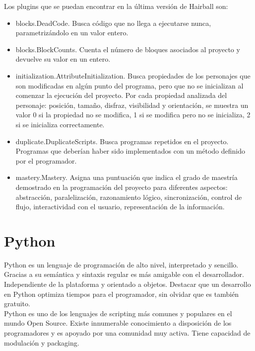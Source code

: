 \documentclass[a4paper, 12pt]{book}
\begin{document}
Los plugins que se puedan encontrar en la última versión de Hairball son:

\begin{itemize}
  \item blocks.DeadCode.
  Busca código que no llega a ejecutarse nunca, parametrizándolo en un valor entero.
  \item blocks.BlockCounts.
  Cuenta el número de bloques asociados al proyecto y devuelve su valor en un entero.
  \item initialization.AttributeInitialization.
  Busca propiedades de los personajes que son modificadas en algún punto del programa,
  pero que no se inicializan al comenzar la 	ejecución del proyecto. Por cada propiedad
  analizada del personaje: posición, tamaño, 	disfraz, visibilidad y orientación, se
  muestra un valor 0 si la propiedad no se modifica, 	1 si se modifica pero no se inicializa,
  2 si se inicializa correctamente.
  \item duplicate.DuplicateScripts.
  Busca programas repetidos en el proyecto. Programas que deberían haber sido implementados
  con un método definido por el programador.
  \item mastery.Mastery.
  Asigna una puntuación que indica el grado de maestría demostrado en la programación del
  proyecto para diferentes aspectos: abstracción, paralelización, razonamiento lógico,
  sincronización, control de flujo, interactividad con el usuario, representación de la información.
	
	
\end{itemize}


\section{Python}
\label{sec:seccion4}

Python es un lenguaje de programación de alto nivel, interpretado y sencillo. Gracias a su 
semántica y sintaxis regular es más amigable con el desarrollador. Independiente
de la plataforma y orientado a objetos. Destacar que un desarrollo en Python optimiza tiempos para
el programador, sin olvidar que es también gratuito. \\

Python es uno de los lenguajes de scripting más comunes y populares en el mundo Open Source. Existe
innumerable conocimiento a disposición de los programadores y es apoyado por una comunidad muy
activa. Tiene capacidad de modulación y packaging. \\
\end{document}
